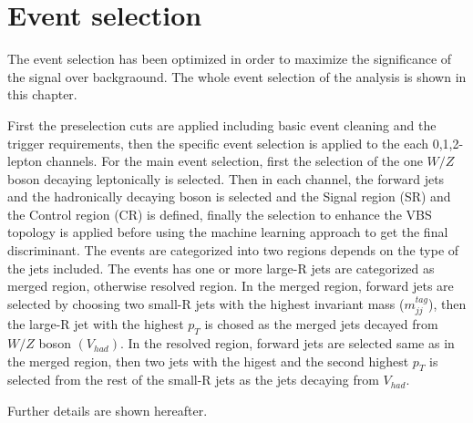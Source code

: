 \chapter{Event selection}
The event selection has been optimized in order to maximize the significance of the signal over backgraound.
The whole event selection of the analysis is shown in this chapter.

First the preselection cuts are applied including basic event cleaning and the trigger requirements, then the specific event selection is applied to the each 0,1,2-lepton channels.
For the main event selection, first the selection of the one $W/Z$ boson decaying leptonically is selected. Then in each channel, the forward jets and the hadronically decaying boson is selected and the Signal region (SR) and the Control region (CR) is defined, finally the selection to enhance the VBS topology is applied before using the machine learning approach to get the final discriminant.
The events are categorized into two regions depends on the type of the jets included. The events has one or more large-R jets are categorized as merged region, otherwise resolved region. In the merged region, forward jets are selected by choosing two small-R jets with the highest invariant mass ($m_{jj}^{tag}$), then the large-R jet with the highest $p_T$ is chosed as the merged jets decayed from $W/Z$ boson $(V_{had})$. In the resolved region, forward jets are selected same as in the merged region, then two jets with the higest and the second highest $p_T$ is selected from the rest of the small-R jets as the jets decaying from $V_{had}$.

Further details are shown hereafter.

